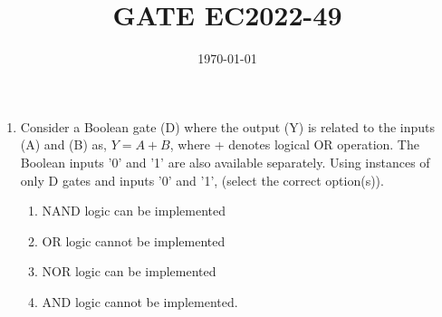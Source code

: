\documentclass[12pt]{article}
\title{GATE EC2022-49}
\date{\today}
\begin{document}
\begin{enumerate}
\item Consider a Boolean gate (D) where the output (Y) is related to the inputs (A) and (B) as, $Y = A + B$, where + denotes logical OR operation. The Boolean inputs '0' and '1' are also available separately. Using instances of only D gates and inputs '0' and '1', (select the correct option(s)).
\begin{enumerate}
\item  NAND logic can be implemented

\item  OR logic cannot be implemented

\item  NOR logic can be implemented

\item  AND logic cannot be implemented.
\end{enumerate}
\end{enumerate}
\end{document}
